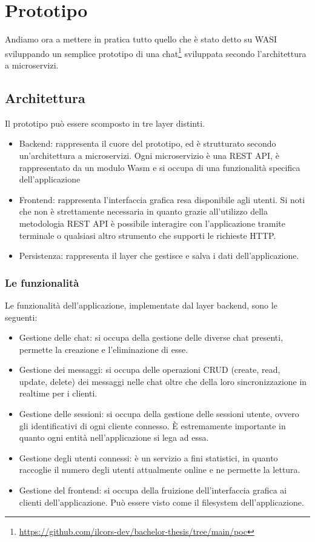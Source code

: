 \chapter{Prototipo}
Andiamo ora a mettere in pratica tutto quello che è stato detto su WASI sviluppando un semplice prototipo di una
chat\footnote{\url{https://github.com/ilcors-dev/bachelor-thesis/tree/main/poc}} sviluppata secondo l'architettura a
microservizi.

\section{Architettura}
Il prototipo può essere scomposto in tre layer distinti.

\begin{itemize}
    \item Backend: rappresenta il cuore del prototipo, ed è strutturato secondo un'architettura a microservizi. Ogni
    microservizio è una REST API, è rappresentato da un modulo Wasm e si occupa di una funzionalità specifica
    dell'applicazione
    \item Frontend: rappresenta l'interfaccia grafica resa disponibile agli utenti. Si noti che non è strettamente
    necessaria in quanto grazie all'utilizzo della metodologia REST API è possibile interagire con l'applicazione
    tramite terminale o qualsiasi altro strumento che supporti le richieste HTTP.
    \item Persistenza: rappresenta il layer che gestisce e salva i dati dell'applicazione.
\end{itemize}

\subsection{Le funzionalità}
Le funzionalità dell'applicazione, implementate dal layer backend, sono le seguenti:
\begin{itemize}
    \item Gestione delle chat: si occupa della gestione delle diverse chat presenti, permette la creazione e
    l'eliminazione di esse.
    \item Gestione dei messaggi: si occupa delle operazioni CRUD (create, read, update, delete) dei messaggi nelle chat
    oltre che della loro sincronizzazione in realtime per i clienti.
    \item Gestione delle sessioni: si occupa della gestione delle sessioni utente, ovvero gli identificativi di ogni
    cliente connesso. È estremamente importante in quanto ogni entità nell'applicazione si lega ad essa.
    \item Gestione degli utenti connessi: è un servizio a fini statistici, in quanto raccoglie il numero degli utenti
    attualmente online e ne permette la lettura.
    \item Gestione del frontend: si occupa della fruizione dell'interfaccia grafica ai clienti dell'applicazione. Può
    essere visto come il filesystem dell'applicazione.
\end{itemize}

